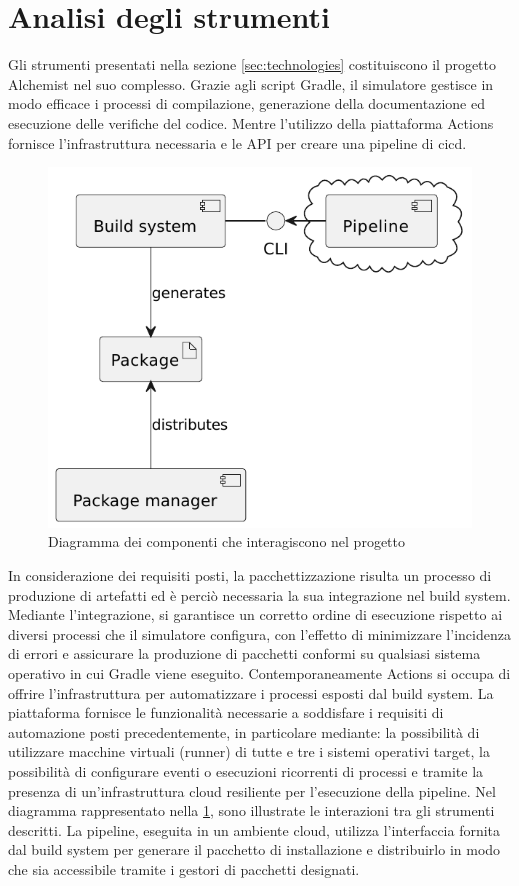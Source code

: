 \section{Analisi degli strumenti}

Gli strumenti presentati nella sezione \ref{sec:technologies} costituiscono il progetto Alchemist nel suo complesso. Grazie agli script Gradle, il simulatore gestisce in modo efficace i processi di compilazione, generazione della documentazione ed esecuzione delle verifiche del codice. Mentre l'utilizzo della piattaforma Actions fornisce l'infrastruttura necessaria e le API per creare una pipeline di \ac{cicd}. 

\begin{figure}[htb]
	\centering
	\includegraphics[width=.6\linewidth]{figures/components-diagram.pdf}
	\caption{Diagramma dei componenti che interagiscono nel progetto}
	\label{fig:components-diagram}
\end{figure}

In considerazione dei requisiti posti, la pacchettizzazione risulta un processo di produzione di artefatti ed è perciò necessaria la sua integrazione nel build system. Mediante l'integrazione, si garantisce un corretto ordine di esecuzione rispetto ai diversi processi che il simulatore configura, con l'effetto di minimizzare l'incidenza di errori e assicurare la produzione di pacchetti conformi su qualsiasi sistema operativo in cui Gradle viene eseguito. Contemporaneamente Actions si occupa di offrire l'infrastruttura per automatizzare i processi esposti dal build system. La piattaforma fornisce le funzionalità necessarie a soddisfare i requisiti di automazione posti precedentemente, in particolare mediante: la possibilità di utilizzare macchine virtuali (runner) di tutte e tre i sistemi operativi target, la possibilità di configurare eventi o esecuzioni ricorrenti di processi e tramite la presenza di un'infrastruttura cloud resiliente per l'esecuzione della pipeline. Nel diagramma rappresentato nella \cref{fig:components-diagram}, sono illustrate le interazioni tra gli strumenti descritti. La pipeline, eseguita in un ambiente cloud, utilizza l'interfaccia fornita dal build system per generare il pacchetto di installazione e distribuirlo in modo che sia accessibile tramite i gestori di pacchetti designati.

